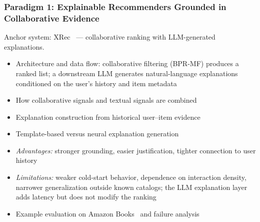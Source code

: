 \documentclass[sigconf,nonacm]{acmart}
\begin{document}
\subsubsection{Paradigm 1: Explainable Recommenders Grounded in Collaborative Evidence}
Anchor system: XRec~\cite{ma2024xrec} --- collaborative ranking with LLM-generated explanations.
\begin{itemize}
    \item Architecture and data flow: collaborative filtering (BPR-MF) produces a ranked list; a downstream LLM generates natural-language explanations conditioned on the user's history and item metadata
    \item How collaborative signals and textual signals are combined
    \item Explanation construction from historical user--item evidence
    \item Template-based versus neural explanation generation
    \item \textit{Advantages:} stronger grounding, easier justification, tighter connection to user history
    \item \textit{Limitations:} weaker cold-start behavior, dependence on interaction density, narrower generalization outside known catalogs; the LLM explanation layer adds latency but does not modify the ranking
    \item Example evaluation on Amazon Books~\cite{amazon2023reviews} and failure analysis
\end{itemize}
\end{document}
